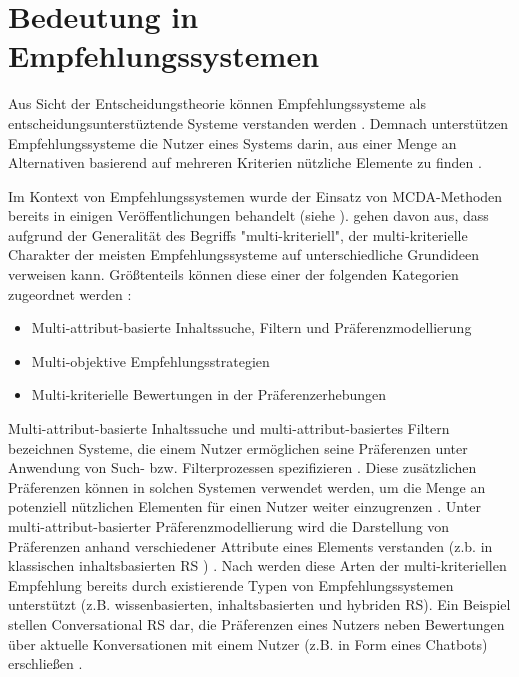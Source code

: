 \section{Bedeutung in Empfehlungssystemen}
\label{ch:erweiterungen:bedeutung}
Aus Sicht der Entscheidungstheorie \cite[S. 77]{jannach:inproceedings} können Empfehlungssysteme als entscheidungsunterstüztende Systeme verstanden werden \cite[S. 398f.]{huang:article}.
Demnach unterstützen Empfehlungssysteme die Nutzer eines Systems darin, aus einer Menge an Alternativen basierend auf mehreren Kriterien nützliche Elemente zu finden \cite[S. 398f.]{huang:article}.

Im Kontext von Empfehlungssystemen wurde der Einsatz von \ac{MCDA}-Metho\-den bereits in einigen Veröffentlichungen behandelt (siehe \cite{hdioud:inproceedings}\cite{zheng:inproceedings}\cite{adomavicius:4:inbook}\cite{adomavicius:inproceedings:2}).
\textcite[S. 849]{adomavicius:4:inbook} gehen davon aus, dass aufgrund der Generalität des Begriffs "multi-kriteriell", der multi-kriterielle Charakter \cite[S. 10]{adomavicius:5:inbook} der meisten Empfehlungssysteme auf unterschiedliche Grundideen verweisen kann.
Größtenteils können diese einer der folgenden Kategorien zugeordnet werden \cite[S. 10]{adomavicius:5:inbook}\cite[S. 849]{adomavicius:4:inbook}:
\begin{itemize}
    \item Multi-attribut-basierte Inhaltssuche, Filtern und Präferenzmodellierung
    \item Multi-objektive Empfehlungsstrategien
    \item Multi-kriterielle Bewertungen in der Präferenzerhebungen
\end{itemize}

Multi-attribut-basierte Inhaltssuche und multi-attribut-basiertes Filtern bezeichnen Systeme, die einem Nutzer ermöglichen seine Präferenzen unter Anwendung von Such- bzw. Filterprozessen spezifizieren \cite[S. 10]{adomavicius:5:inbook}\cite[S. 851]{adomavicius:4:inbook}.
Diese zusätzlichen Präferenzen können in solchen Systemen verwendet werden, um die Menge an potenziell nützlichen Elementen für einen Nutzer weiter einzugrenzen \cite[S. 11]{adomavicius:5:inbook}.
Unter multi-attribut-basierter Präferenzmodellierung wird die Darstellung von Präferenzen anhand verschiedener Attribute eines Elements verstanden (z.b. in klassischen inhaltsbasierten \ac{RS} \cite[S. 205]{hdioud:inproceedings}) \cite[S. 10]{adomavicius:5:inbook}.
Nach \textcite[S. 850]{adomavicius:4:inbook} werden diese Arten der multi-kriteriellen Empfehlung bereits durch existierende Typen von Empfehlungssystemen unterstützt (z.B. wissenbasierten, inhaltsbasierten und hybriden \ac{RS}).
Ein Beispiel stellen Conversational \ac{RS} dar, die Präferenzen eines Nutzers neben Bewertungen über aktuelle Konversationen mit einem Nutzer (z.B. in Form eines Chatbots) erschließen \cite[S. 1]{yueming:article}.

